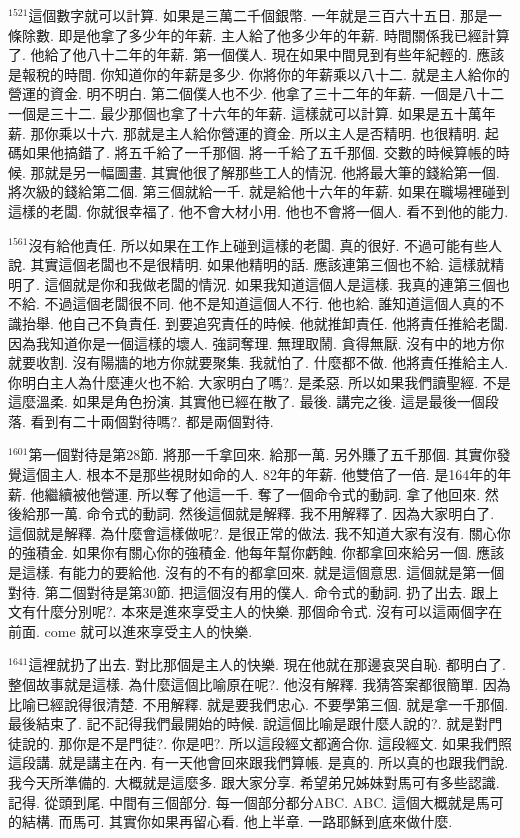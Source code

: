 \documentclass{book}
\begin{document}
$^{1521}$這個數字就可以計算.
如果是三萬二千個銀幣.
一年就是三百六十五日.
那是一條除數.
即是他拿了多少年的年薪.
主人給了他多少年的年薪.
時間關係我已經計算了.
他給了他八十二年的年薪.
第一個僕人.
現在如果中間見到有些年紀輕的.
應該是報稅的時間.
你知道你的年薪是多少.
你將你的年薪乘以八十二.
就是主人給你的營運的資金.
明不明白.
第二個僕人也不少.
他拿了三十二年的年薪.
一個是八十二一個是三十二.
最少那個也拿了十六年的年薪.
這樣就可以計算.
如果是五十萬年薪.
那你乘以十六.
那就是主人給你營運的資金.
所以主人是否精明.
也很精明.
起碼如果他搞錯了.
將五千給了一千那個.
將一千給了五千那個.
交數的時候算帳的時候.
那就是另一幅圖畫.
其實他很了解那些工人的情況.
他將最大筆的錢給第一個.
將次級的錢給第二個.
第三個就給一千.
就是給他十六年的年薪.
如果在職場裡碰到這樣的老闆.
你就很幸福了.
他不會大材小用.
他也不會將一個人.
看不到他的能力.

$^{1561}$沒有給他責任.
所以如果在工作上碰到這樣的老闆.
真的很好.
不過可能有些人說.
其實這個老闆也不是很精明.
如果他精明的話.
應該連第三個也不給.
這樣就精明了.
這個就是你和我做老闆的情況.
如果我知道這個人是這樣.
我真的連第三個也不給.
不過這個老闆很不同.
他不是知道這個人不行.
他也給.
誰知道這個人真的不識抬舉.
他自己不負責任.
到要追究責任的時候.
他就推卸責任.
他將責任推給老闆.
因為我知道你是一個這樣的壞人.
強詞奪理.
無理取鬧.
貪得無厭.
沒有中的地方你就要收割.
沒有陽牆的地方你就要聚集.
我就怕了.
什麼都不做.
他將責任推給主人.
你明白主人為什麼連火也不給.
大家明白了嗎?.
是柔惡.
所以如果我們讀聖經.
不是這麼溫柔.
如果是角色扮演.
其實他已經在散了.
最後.
講完之後.
這是最後一個段落.
看到有二十兩個對待嗎?.
都是兩個對待.

$^{1601}$第一個對待是第28節.
將那一千拿回來.
給那一萬.
另外賺了五千那個.
其實你發覺這個主人.
根本不是那些視財如命的人.
82年的年薪.
他雙倍了一倍.
是164年的年薪.
他繼續被他營運.
所以奪了他這一千.
奪了一個命令式的動詞.
拿了他回來.
然後給那一萬.
命令式的動詞.
然後這個就是解釋.
我不用解釋了.
因為大家明白了.
這個就是解釋.
為什麼會這樣做呢?.
是很正常的做法.
我不知道大家有沒有.
關心你的強積金.
如果你有關心你的強積金.
他每年幫你虧蝕.
你都拿回來給另一個.
應該是這樣.
有能力的要給他.
沒有的不有的都拿回來.
就是這個意思.
這個就是第一個對待.
第二個對待是第30節.
把這個沒有用的僕人.
命令式的動詞.
扔了出去.
跟上文有什麼分別呢?.
本來是進來享受主人的快樂.
那個命令式.
沒有可以這兩個字在前面.
come 就可以進來享受主人的快樂.

$^{1641}$這裡就扔了出去.
對比那個是主人的快樂.
現在他就在那邊哀哭自恥.
都明白了.
整個故事就是這樣.
為什麼這個比喻原在呢?.
他沒有解釋.
我猜答案都很簡單.
因為比喻已經說得很清楚.
不用解釋.
就是要我們忠心.
不要學第三個.
就是拿一千那個.
最後結束了.
記不記得我們最開始的時候.
說這個比喻是跟什麼人說的?.
就是對門徒說的.
那你是不是門徒?.
你是吧?.
所以這段經文都適合你.
這段經文.
如果我們照這段講.
就是講主在內.
有一天他會回來跟我們算帳.
是真的.
所以真的也跟我們說.
我今天所準備的.
大概就是這麼多.
跟大家分享.
希望弟兄姊妹對馬可有多些認識.
記得.
從頭到尾.
中間有三個部分.
每一個部分都分ABC.
ABC.
這個大概就是馬可的結構.
而馬可.
其實你如果再留心看.
他上半章.
一路耶穌到底來做什麼.
\end{document}
